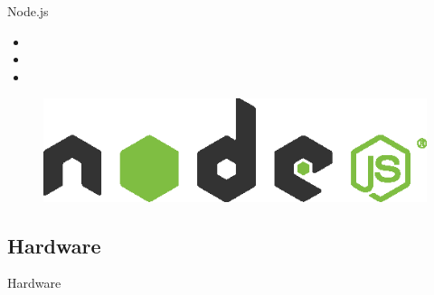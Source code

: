 \begin{frame}{Node.js}
  \begin{itemize}
    \item
    \item
    \item
  \end{itemize}
  \begin{figure}[htb]
    \centering
    \includegraphics[width=0.97\linewidth, keepaspectratio]{./resources/nodejs-light.eps}
     \nocite{nodejs:logo}
  \end{figure}
\end{frame}

\subsection{Hardware}
\begin{frame}{Hardware}

\end{frame}

